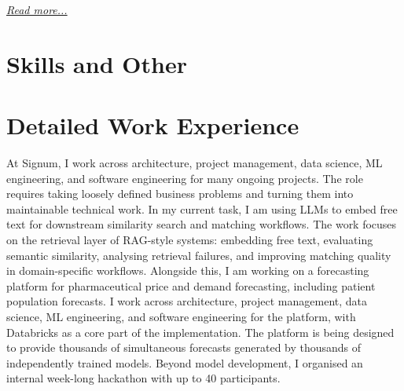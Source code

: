 \documentclass[11pt,a4paper]{moderncv}
\begin{document}
\hfill{\small{\textit{\hyperref[sec:signum]{Read more...}}}}

\section{Skills and Other}
\normalsize
{}


\newpage

\section{Detailed Work Experience}

\label{sec:signum}
 {
    At Signum, I work across architecture, project management, data science, ML engineering, and software engineering for many ongoing projects. The role requires taking loosely defined business problems and turning them into maintainable technical work.
    \newline\hspace*{2em}
    In my current task, I am using LLMs to embed free text for downstream similarity search and matching workflows. The work focuses on the retrieval layer of RAG-style systems: embedding free text, evaluating semantic similarity, analysing retrieval failures, and improving matching quality in domain-specific workflows.
    \newline\hspace*{2em}
    Alongside this, I am working on a forecasting platform for pharmaceutical price and demand forecasting, including patient population forecasts. I work across architecture, project management, data science, ML engineering, and software engineering for the platform, with Databricks as a core part of the implementation. The platform is being designed to provide thousands of simultaneous forecasts generated by thousands of independently trained models.
    \newline\hspace*{2em}
    Beyond model development, I organised an internal week-long hackathon with up to 40 participants.
}{}
\end{document}
